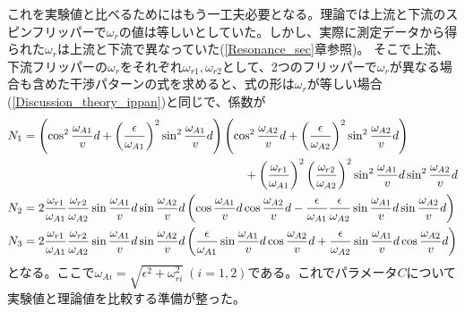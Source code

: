 これを実験値と比べるためにはもう一工夫必要となる。理論では上流と下流のスピンフリッパーで$\omega_r$の値は等しいとしていた。しかし、実際に測定データから得られた$\omega_r$は上流と下流で異なっていた(\ref{Resonance_sec}章参照)。%
そこで上流、下流フリッパーの$\omega_r$をそれぞれ$\omega_{r1},\omega_{r2}$として、2つのフリッパーで$\omega_r$が異なる場合も含めた干渉パターンの式を求めると、式の形は$\omega_r$が等しい場合(\ref{Discussion_theory_ippan})と同じで、係数が
\begin{align}
&N_1 = \left(\cos^2 \frac{\omega_{A1}}{v}d +\left(\frac{\epsilon}{\omega_{A1}}\right)^2\sin^2 \frac{\omega_{A1}}{v}d\right)\left(\cos^2 \frac{\omega_{A2}}{v}d+\left(\frac{\epsilon}{\omega_{A2}}\right)^2 \sin^2 \frac{\omega_{A2}}{v}d\right)\\ \notag
&\hspace{7cm}+\left(\frac{\omega_{r1}}{\omega_{A1}}\right)^2\left(\frac{\omega_{r2}}{\omega_{A2}}\right)^2 \sin^2 \frac{\omega_{A1}}{v}d \sin^2 \frac{\omega_{A2}}{v}d\\
&N_2 = 2\frac{\omega_{r1}}{\omega_{A1}}\frac{\omega_{r2}}{\omega_{A2}}\sin\frac{\omega_{A1}}{v}d\sin\frac{\omega_{A2}}{v}d \left(\cos \frac{\omega_{A1}}{v}d\cos \frac{\omega_{A2}}{v}d -\frac{\epsilon}{\omega_{A1}}\frac{\epsilon}{\omega_{A2}} \sin \frac{\omega_{A1}}{v}d\sin \frac{\omega_{A2}}{v}d\right) \\
&N_3 = 2\frac{\omega_{r1}}{\omega_{A1}}\frac{\omega_{r2}}{\omega_{A2}}\sin\frac{\omega_{A1}}{v}d\sin\frac{\omega_{A2}}{v}d \left(\frac{\epsilon}{\omega_{A1}}\sin \frac{\omega_{A1}}{v}d\cos \frac{\omega_{A2}}{v}d +\frac{\epsilon}{\omega_{A2}} \sin \frac{\omega_{A1}}{v}d\cos \frac{\omega_{A2}}{v}d\right)
\end{align}\label{Discussion_theory_ippanippan}
となる。ここで$\omega_{Ai}=\sqrt{\epsilon^2+\omega_{ri}^2} \ (i=1,2)$である。これでパラメータ$C$について実験値と理論値を比較する準備が整った。

